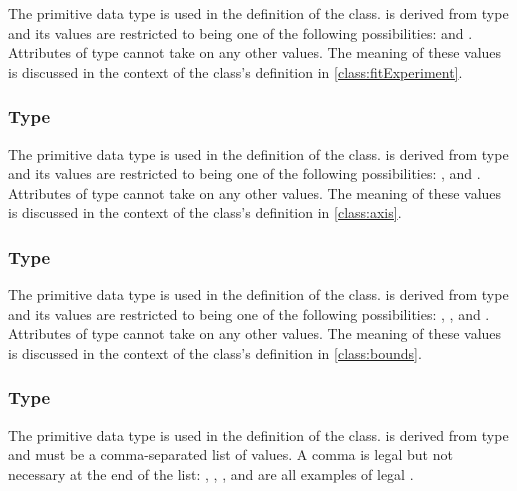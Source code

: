 The  primitive data type is used in the definition of the \FitExperiment class.   is derived from type  and its values are restricted to being one of the following possibilities:  and .  Attributes of type  cannot take on any other values.  The meaning of these values is discussed in the context of the \FitExperiment class's definition in \ref{class:fitExperiment}.


\subsubsection[\element{AxisType}]{Type }
\label{type:axisType}

The  primitive data type is used in the definition of the \Axis class.   is derived from type  and its values are restricted to being one of the following possibilities: , and .  Attributes of type  cannot take on any other values.  The meaning of these values is discussed in the context of the \Axis class's definition in \ref{class:axis}.

\subsubsection[\element{ScaleType}]{Type }
\label{type:scaleType}

The  primitive data type is used in the definition of the \Bounds class.   is derived from type  and its values are restricted to being one of the following possibilities: , , and .  Attributes of type  cannot take on any other values.  The meaning of these values is discussed in the context of the \Bounds class's definition in \ref{class:bounds}.

\begin{blockChanged}
\subsubsection[\element{listOfDoubles}]{Type }
\label{type:listOfDoubles}

The  primitive data type is used in the definition of the \SpecificTimeCourse class.   is derived from type  and must be a comma-separated list of  values.  A comma is legal but not necessary at the end of the list: , , , and  are all examples of legal .
\end{blockChanged}



